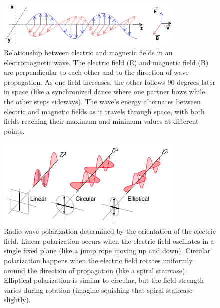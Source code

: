 \begin{figure}[h]
    \centering
    \includegraphics[width=0.8\textwidth]{tech/images/em-wave.png}
    \caption{Relationship between electric and magnetic fields in an electromagnetic wave. The electric field (E) and magnetic field (B) are perpendicular to each other and to the direction of wave propagation. As one field increases, the other follows 90 degrees later in space (like a synchronized dance where one partner bows while the other steps sideways). The wave's energy alternates between electric and magnetic fields as it travels through space, with both fields reaching their maximum and minimum values at different points.}
    \label{fig:em-wave}
\end{figure}

\begin{figure}[h]
    \centering
    \includegraphics[width=0.8\textwidth]{tech/images/polarization.png}
    \caption{Radio wave polarization determined by the orientation of the electric field. Linear polarization occurs when the electric field oscillates in a single fixed plane (like a jump rope moving up and down). Circular polarization happens when the electric field rotates uniformly around the direction of propagation (like a spiral staircase). Elliptical polarization is similar to circular, but the field strength varies during rotation (imagine squishing that spiral staircase slightly).}
    \label{fig:polarization}
\end{figure}

